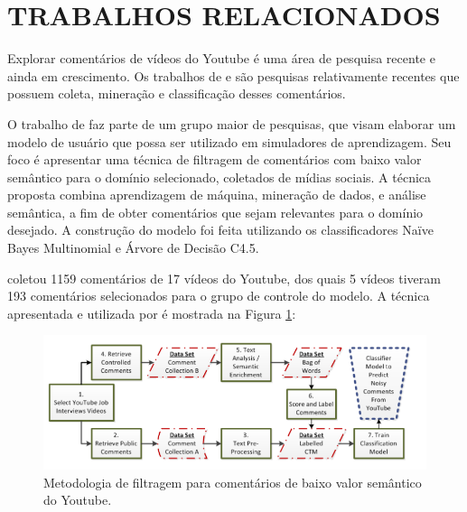 \newpage
\section{TRABALHOS RELACIONADOS}

Explorar comentários de vídeos do Youtube é uma área de pesquisa recente e ainda em crescimento. Os trabalhos de  e  são pesquisas relativamente recentes que possuem coleta, mineração e classificação desses comentários.

O trabalho de  faz parte de um grupo maior de pesquisas, que visam elaborar um modelo de usuário que possa ser utilizado em simuladores de aprendizagem. Seu foco é apresentar uma técnica de filtragem de comentários com baixo valor semântico para o domínio selecionado, coletados de mídias sociais. A técnica proposta combina aprendizagem de máquina, mineração de dados, e análise semântica, a fim de obter comentários que sejam relevantes para o domínio desejado. A construção do modelo foi feita utilizando os classificadores Naïve Bayes Multinomial e Árvore de Decisão C4.5.

 coletou 1159 comentários de 17 vídeos do Youtube, dos quais 5 vídeos tiveram 193 comentários selecionados para o grupo de controle do modelo. A técnica apresentada e utilizada por  é mostrada na Figura \ref{fig:ammari-metodologia}:

\begin{figure}[H] %
	\caption{\label{fig:ammari-metodologia} Metodologia de filtragem para comentários de baixo valor semântico do Youtube.}
	\begin{center}
	    \includegraphics[scale=0.8]{figuras/figura_3.PNG} %
	\end{center}
\end{figure}

